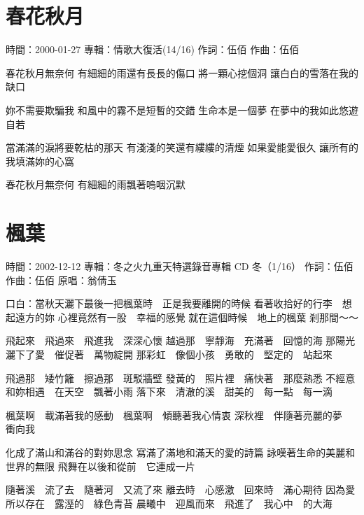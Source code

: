 \documentclass[UTF8,a4paper,oneside,twocolumn,12pt]{ctexbook}
\newcommand{\infopair}[2]{\textbullet #1：#2}
\newcommand{\zc}[1][伍佰]{\infopair{作詞}{#1}}
\newcommand{\zq}[1][伍佰]{\infopair{作曲}{#1}}
\newcommand{\zj}[1]{\infopair{專輯}{#1}}
\newcommand{\yc}[1]{\infopair{原唱}{#1}}
\newcommand{\sj}[1]{\infopair{時間}{#1}}
\newenvironment{info}{\begin{flushleft}\kaishu
	}
	{\end{flushleft}\normalsize\yahei\par}
\newenvironment{lyric}{
	}
{}
\begin{document}
\section{春花秋月}
\begin{info}
	\sj{2000-01-27}
	\zj{情歌大復活(14/16)}
	\zc
	\zq
\end{info}
\begin{lyric}%
	春花秋月無奈何
	有細細的雨還有長長的傷口
	將一顆心挖個洞
	讓白白的雪落在我的缺口

	妳不需要欺騙我
	和風中的霧不是短暫的交錯
	生命本是一個夢
	在夢中的我如此悠遊自若

	當滿滿的淚將要乾枯的那天
	有淺淺的笑還有縷縷的清煙
	如果愛能愛很久
	讓所有的我填滿妳的心窩

	春花秋月無奈何
	有細細的雨飄著嗚咽沉默
\end{lyric}

\section{楓葉}
\begin{info}
	\sj{2002-12-12}
	\zj{冬之火九重天特選錄音專輯 CD 冬（1/16）}
	\zc
	\zq
	\yc{翁倩玉}
\end{info}
\begin{lyric}
	口白：當秋天灑下最後一把楓葉時　正是我要離開的時候
	看著收拾好的行李　想起遠方的妳
	心裡竟然有一股　幸福的感覺
	就在這個時候　地上的楓葉
	剎那間～～

	飛起來　飛過來　飛進我　深深心懷
	越過那　寧靜海　充滿著　回憶的海
	那陽光　灑下了愛　催促著　萬物綻開
	那彩虹　像個小孩　勇敢的　堅定的　站起來

	飛過那　矮竹籬　擦過那　斑駁牆壁
	發黃的　照片裡　痛快著　那麼熟悉
	不經意　和妳相遇　在天空　飄著小雨
	落下來　清澈的溪　甜美的　每一點　每一滴

	楓葉啊　載滿著我的感動　楓葉啊　傾聽著我心情衷
	深秋裡　伴隨著亮麗的夢　衝向我

	化成了滿山和滿谷的對妳思念
	寫滿了滿地和滿天的愛的詩篇
	詠嘆著生命的美麗和世界的無限
	飛舞在以後和從前　它連成一片

	隨著溪　流了去　隨著河　又流了來
	離去時　心感激　回來時　滿心期待
	因為愛　所以存在　露溼的　綠色青苔
	晨曦中　迎風而來　飛進了　我心中　的大海
\end{lyric}
\end{document}
